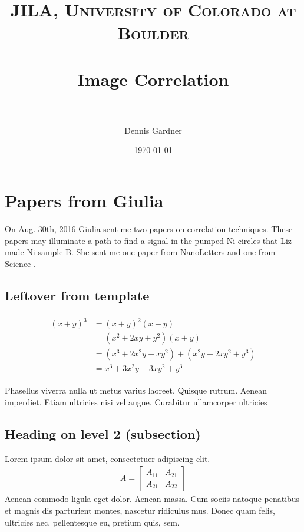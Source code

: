 \documentclass{article}
\title{	
\normalfont \normalsize 
\textsc{JILA, University of Colorado at Boulder} \\ [25pt] %
\horrule{0.5pt} \\[0.4cm] %
\huge Image Correlation \\ %
\horrule{2pt} \\[0.5cm] %
}
\author{Dennis Gardner} %
\date{\normalsize\today} %
\numberwithin{equation}{section} %
\numberwithin{figure}{section} %
\numberwithin{table}{section} %
\begin{document}
\maketitle %


\section{Papers from Giulia}

On Aug. 30th, 2016 Giulia sent me two papers on correlation techniques. These papers may illuminate a path to find a signal in the pumped Ni circles that Liz made Ni sample B. She sent me one paper from NanoLetters \cite{Kwon2008} and one from Science \cite{Barwick2008a}. 









\subsection{Leftover from template}

\lipsum[2] %


\begin{align} 
\begin{split}
(x+y)^3 	&= (x+y)^2(x+y)\\
&=(x^2+2xy+y^2)(x+y)\\
&=(x^3+2x^2y+xy^2) + (x^2y+2xy^2+y^3)\\
&=x^3+3x^2y+3xy^2+y^3
\end{split}					
\end{align}

Phasellus viverra nulla ut metus varius laoreet. Quisque rutrum. Aenean imperdiet. Etiam ultricies nisi vel augue. Curabitur ullamcorper ultricies


\subsection{Heading on level 2 (subsection)}

Lorem ipsum dolor sit amet, consectetuer adipiscing elit. 
\begin{align}
A = 
\begin{bmatrix}
A_{11} & A_{21} \\
A_{21} & A_{22}
\end{bmatrix}
\end{align}
Aenean commodo ligula eget dolor. Aenean massa. Cum sociis natoque penatibus et magnis dis parturient montes, nascetur ridiculus mus. Donec quam felis, ultricies nec, pellentesque eu, pretium quis, sem.
\end{document}
